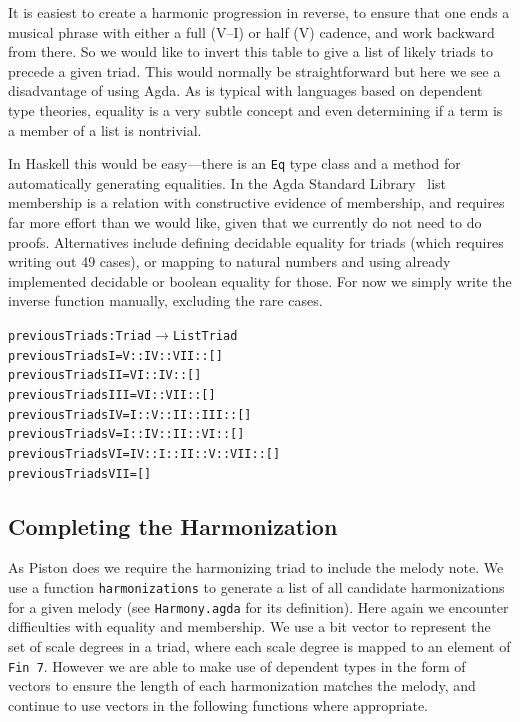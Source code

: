 It is easiest to create a harmonic progression in reverse, to
ensure that one ends a musical phrase with either a full (V--I) or half (V)
cadence, and work backward from there. So we would like to invert this
table to give a list of likely triads to precede a given triad. This
would normally be straightforward but here we see a disadvantage of
using Agda. As is typical with languages based on dependent type
theories, equality is a very subtle concept and even determining if a
term is a member of a list is nontrivial.

In Haskell this would be easy---there is an \texttt{Eq} type class and a
method for automatically generating equalities. In the Agda Standard
Library~\citep{agda-stdlib} list membership is a relation with
constructive evidence of membership, and requires far more effort than we
would like, given that we currently do not need to do
proofs. Alternatives include defining decidable equality for triads
(which requires writing out 49 cases), or mapping to natural numbers
and using already implemented decidable or boolean equality for
those. For now we simply write the inverse function manually,
excluding the rare cases.

\begin{alltt}
previousTriads : Triad \(\rightarrow\) List Triad
previousTriads I   = V :: IV :: VII :: []
previousTriads II  = VI :: IV :: []
previousTriads III = VI :: VII :: []
previousTriads IV  = I :: V :: II :: III :: []
previousTriads V   = I :: IV :: II :: VI :: []
previousTriads VI  = IV :: I :: II :: V :: VII :: []
previousTriads VII = []
\end{alltt}

\subsection{Completing the Harmonization}
\label{sec:harmony:complete}

As Piston does we require the harmonizing triad to include the melody
note. We use a function \texttt{harmonizations} to generate a list of
all candidate harmonizations for a given melody (see
\texttt{Harmony.agda} for its definition). Here again we encounter difficulties
with equality and membership. We use a bit vector to represent the
set of scale degrees in a triad, where each scale degree is mapped to
an element of \texttt{Fin 7}. However we are able to make use of
dependent types in the form of vectors to ensure the length of each
harmonization matches the melody, and continue to use vectors in the
following functions where appropriate.

